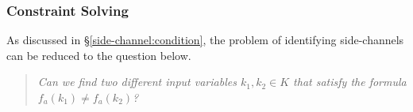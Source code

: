\begin{table}%
      \centering%
      \caption{The number of x86,  %
             REIL IR, and VEX IR instructions on the traces of crypto programs.}
      \label{scala:ir}
\end{table}

\subsubsection{Constraint Solving}
As discussed in \S\ref{side-channel:condition}, the problem of identifying
side-channels can be reduced to the question below.

\begin{quote}
      \textit{Can we find two different input variables $k_1, k_2 \in K$ that
            satisfy the formula $f_a(k_1) \neq f_a(k_2)$?}
\end{quote}

